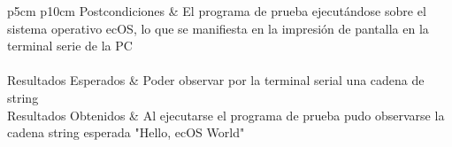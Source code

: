 \begin{table}[h!]
\begin{tabular}{ p{5cm} p{10cm}  }
		\hline
		Postcondiciones &  El programa de prueba ejecutándose sobre el sistema operativo ecOS, lo que se manifiesta en la impresión de pantalla en la
		terminal serie de la PC\\
		\hline
 		\\
		\hline
		Resultados Esperados & Poder observar por la terminal serial una cadena de string \\
		\hline	
		Resultados Obtenidos & Al ejecutarse el programa de prueba pudo observarse la cadena string esperada "Hello, ecOS World"\\
		\hline
		\end{tabular}
		\caption{Caso de prueba T009}
		\end{table}

\newpage			


